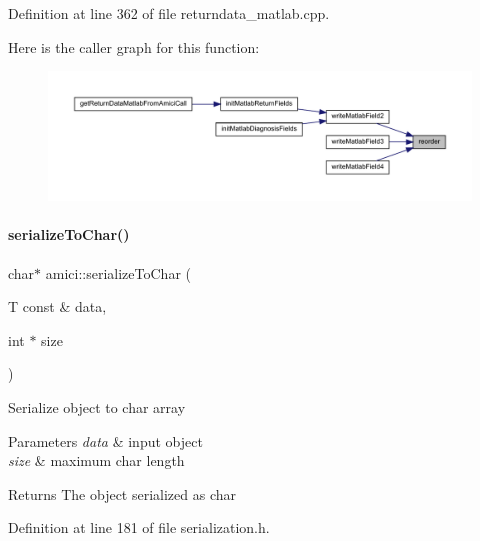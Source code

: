 Definition at line 362 of file returndata\+\_\+matlab.\+cpp.

Here is the caller graph for this function\+:
\nopagebreak
\begin{figure}[H]
\begin{center}
\leavevmode
\includegraphics[width=350pt]{namespaceamici_a34977c9aa241ea37421d94946baa77d2_icgraph}
\end{center}
\end{figure}
\mbox{\label{namespaceamici_a042a9a4166aeef6cd263d9975a4192ed}} 
\paragraph{\texorpdfstring{serializeToChar()}{serializeToChar()}}
{\footnotesize\ttfamily char$\ast$ amici\+::serialize\+To\+Char (\begin{DoxyParamCaption}\item[{T const \&}]{data,  }\item[{int $\ast$}]{size }\end{DoxyParamCaption})}

Serialize object to char array


\begin{DoxyParams}{Parameters}
{\em data} & input object \\
\hline
{\em size} & maximum char length\\
\hline
\end{DoxyParams}
\begin{DoxyReturn}{Returns}
The object serialized as char
\end{DoxyReturn}


Definition at line 181 of file serialization.\+h.

\mbox{\label{namespaceamici_ad633859edca1bf95ecdbdb5500d3c28c}} 
